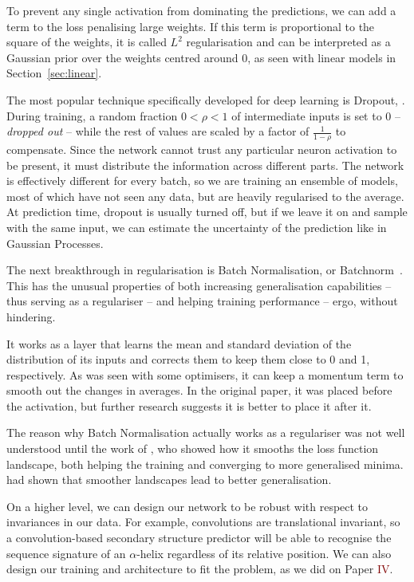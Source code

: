 To prevent any single activation from dominating the predictions, we can add a term to the loss penalising large weights. 
If this term is proportional to the square of the weights, it is called $L^2$ regularisation and can be interpreted as a Gaussian prior over the weights centred around $0$, as seen with linear models in Section~\ref{sec:linear}.

The most popular technique  
specifically developed for deep learning is Dropout, \citep{dropout}.
During training, a random fraction $0 < \rho < 1$ of intermediate inputs is set to $0$ -- \emph{dropped out} --  while the rest of values are scaled by a factor of $\frac{1}{1-\rho}$ to compensate.
Since the network cannot trust any particular neuron activation to be present, it must distribute the information across different parts.
The network is effectively different for every batch, so we are training an ensemble of models, most of which have not seen any data, but are heavily regularised to the average.
At prediction time, dropout is usually turned off, but if we leave it on and sample with the same input, we can estimate the uncertainty of the prediction like in Gaussian Processes.

The next breakthrough in regularisation is Batch Normalisation, or Batchnorm~\citep{bn}. 
This has the unusual properties of both increasing generalisation capabilities -- thus serving as a regulariser -- and helping training performance -- ergo, without hindering.

It works as a layer that learns the mean and standard deviation of the distribution of its inputs and corrects them to keep them close to 0 and 1, respectively.
As was seen with some optimisers, it can keep a momentum term to smooth out the changes in averages.
In the original paper, it was placed before the activation, but further research suggests it is better to place it after it.


The reason why Batch Normalisation 
actually works as a regulariser was not well understood until the work of \citet{how_bn_works}, who showed how it smooths the loss function landscape, both helping the training and converging to more generalised minima.
\citet{large_batch} had shown that smoother landscapes lead to better generalisation.

On a higher level, we can design our network to be robust with respect to invariances in our data. 
For example, convolutions are translational invariant, so a convolution-based secondary structure predictor will be able to recognise the sequence signature of an $\alpha$-helix regardless of its relative position.
We can also  design our training and architecture to fit the problem, as we did on Paper \textcolor{Maroon}{IV}.

